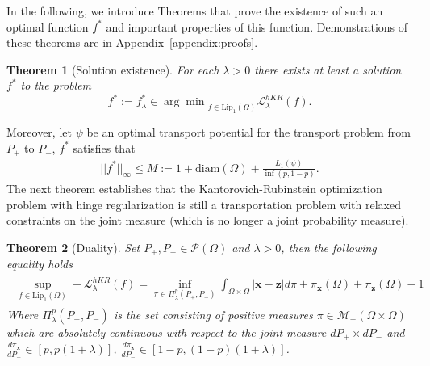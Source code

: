 \documentclass{article}
\newtheorem{Theorem}{Theorem}
\begin{document}
In the following, we introduce Theorems that prove the existence of such an optimal function $f^*$ and important properties of this function. Demonstrations of these theorems are in Appendix~\ref{appendix:proofs}.
\begin{Theorem} [Solution existence]
\label{Lemma:bounded_M}
 For each $\lambda>0$ there exists at least a solution $f^*$ to the problem  \[ f^*:=f_{\lambda}^*\in{\arg\min}_{f\in \text{Lip}_1(\Omega)}\mathcal{L}^{hKR}_{\lambda}(f) . \]
\end{Theorem}
Moreover, let $\psi$ be an optimal transport potential for the transport problem from $P_+$ to $ P_-$, $f^*$ satisfies that 
\begin{align}\label{eq:M}
	|| f^*||_{\infty}\leq M:= 1+\text{diam}(\Omega)+\frac{L_1(\psi)}{\inf(p,1-p)}.
\end{align}
The next theorem establishes that the Kantorovich-Rubinstein optimization problem with hinge regularization is still a transportation problem with relaxed constraints on the joint measure (which is no longer a joint probability measure).
\begin{Theorem}[Duality]\label{Theo:dual}
Set  $P_+, P_-\in \mathcal{P}(\Omega)$ and $\lambda>0$, then the following equality holds
\begin{align}\label{eq:dual}
\begin{split}
 \sup_{f\in \text{Lip}_1(\Omega)}- \mathcal{L}^{hKR}_\lambda(f)=	\inf_{\pi \in\Pi^p_{\lambda}(P_+, P_-)}\int_{\Omega\times \Omega}|{\textbf{x}}-{{\textbf{z}}} |d\pi + \pi_{\textbf{x}}(\Omega)+\pi_{{\textbf{z}}}(\Omega)-1
	\end{split}
\end{align}
Where $\Pi^p_{\lambda}(P_+, P_-)$ is the set consisting of positive measures $\pi\in \mathcal{M}_+(\Omega\times \Omega)$ which  are absolutely continuous with respect to the joint measure $dP_+\times dP_-$ and $\frac{d\pi_{\textbf{x}}}{dP_+}\in [p, p(1+\lambda)]$, $\frac{d\pi_{{\textbf{z}}}}{dP_-}\in [1-p, (1-p)(1+\lambda)] $.
\end{Theorem}
\end{document}
